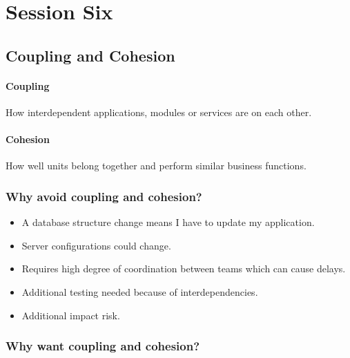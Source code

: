 \section{Session Six}\label{sec:fpse_session_six}

\subsection{Coupling and Cohesion}\label{sub:coupling_and_cohesion}

\paragraph{Coupling}\label{par:coupling}

How interdependent applications, modules or services are on each other.

\paragraph{Cohesion}\label{par:cohesion}

How well units belong together and perform similar business functions.

\subsubsection{Why avoid coupling and cohesion?}\label{ssub:why_avoid_coupling_and_cohesion_}

\begin{itemize}

    \item A database structure change means I have to update my application.
    \item Server configurations could change.
    \item Requires high degree of coordination between teams which can cause delays.
    \item Additional testing needed because of interdependencies.
    \item Additional impact risk.
\end{itemize}

\subsubsection{Why want coupling and cohesion?}\label{ssub:why_want_coupling_and_cohesion_}

